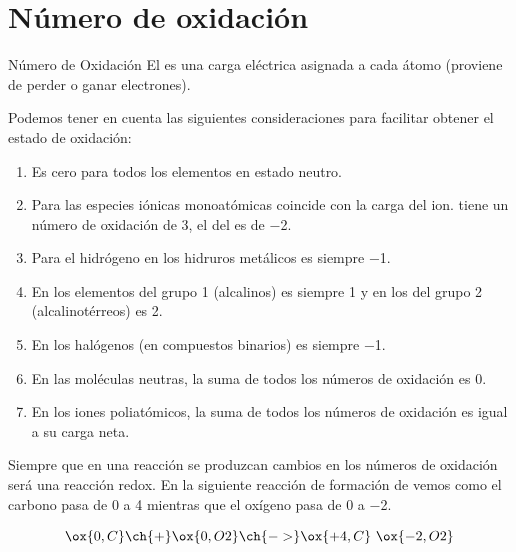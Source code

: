 

    \section{Número de oxidación}\label{subsec:numero-de-oxidacion}

    \begin{center}
        \begin{definicion}[width=0.9\textwidth]{Número de Oxidación}
            El  es una carga eléctrica asignada a cada átomo (proviene de perder o ganar electrones).
        \end{definicion}
    \end{center}


    Podemos tener en cuenta las siguientes consideraciones para facilitar obtener el estado de oxidación:

    \begin{enumerate}[label=\numberballmDarkTeal]
        \item Es cero para todos los elementos en estado neutro.
        \item Para las especies iónicas monoatómicas coincide con la carga del ion.  tiene un número de oxidación de \num{+3}, el del  es de \num{-2}.
        \item Para el hidrógeno en los hidruros metálicos es siempre \num{-1}.
        \item En los elementos del grupo 1 (alcalinos) es siempre \num{+1} y en los del grupo 2 (alcalinotérreos) es \num{+2}.
        \item En los halógenos (en compuestos binarios) es siempre \num{-1}.
        \item En las moléculas neutras, la suma de todos los números de oxidación es \num{0}.
        \item En los iones poliatómicos, la suma de todos los números de oxidación es igual a su carga neta.
    \end{enumerate}

    Siempre que en una reacción se produzcan cambios en los números de oxidación será una reacción redox.
    En la siguiente reacción de formación de  vemos como el carbono pasa de \num{0} a \num{+4} mientras que el oxígeno pasa de \num{0} a \num{-2}.

    \begin{equation*}
        \ox{0,C} \ch{+} \ox{0,O2} \ch{->} \ox{+4,C}\ \ox{-2,O2}
    \end{equation*}

